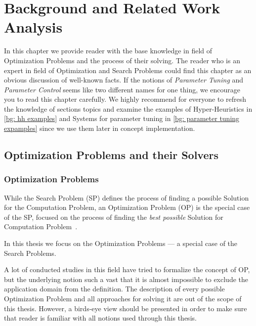 \chapter{Background and Related Work Analysis}\label{bg}
In this chapter we provide reader with the base knowledge in field of Optimization Problems and the process of their solving.
The reader who is an expert in field of Optimization and Search Problems could find this chapter as an obvious discussion of well-known facts. If the notions of \textit{Parameter Tuning} and \textit{Parameter Control} seems like two different names for one thing, we encourage you to read this chapter carefully.
We highly recommend for everyone to refresh the knowledge of sections topics and examine the examples of Hyper-Heuristics in \ref{bg: hh examples} and Systems for parameter tuning in \ref{bg: parameter tuning expamples} since we use them later in concept implementation.


\section{Optimization Problems and their Solvers}\label{bg:opt problems and solvers}


\subsection{Optimization Problems}\label{BG: subsection OPs}
While the Search Problem (SP) defines the process of finding a possible Solution for the Computation Problem, an Optimization Problem (OP) is the special case of the SP, focused on the process of finding the \emph{best possible} Solution for Computation Problem~\cite{goldreich2010p}. 


In this thesis we focus on the Optimization Problems — a special case of the Search Problems.


A lot of conducted studies in this field have tried to formalize the concept of OP, but the underlying notion such a vast that it is almost impossible to exclude the application domain from the definition. The description of every possible Optimization Problem and all approaches for solving it are out of the scope of this thesis. However, a birds-eye view should be presented in order to make sure that reader is familiar with all notions used through this thesis. 


